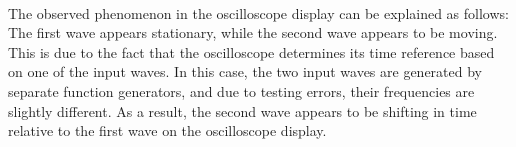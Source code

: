 \documentclass[11pt]{article}
\begin{document}
\begin{question}
{        \paragraph*{}
        The observed phenomenon in the oscilloscope display can
        be explained as follows: The first wave appears stationary,
        while the second wave appears to be moving.
        This is due to the fact that the oscilloscope determines
        its time reference based on one of the input waves.
        In this case, the two input waves are generated by separate function
        generators, and due to testing errors, their frequencies are
        slightly different. As a result, the second wave appears to be
        shifting in time relative to the first wave on the
        oscilloscope display.

    }

\end{question}

\end{document}
